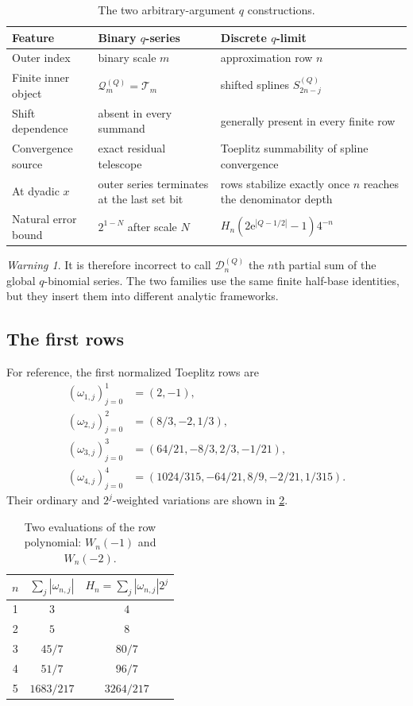 \documentclass[11pt,oneside]{article}
\theoremstyle{definition}
\theoremstyle{remark}
\newtheorem{warning}[warning]{Warning}
\newcommand{\e}{\mathrm e}
\begin{document}
\begin{table}[ht]
\centering
\small
\begin{tabularx}{\textwidth}{@{}p{}XX@{}}
\toprule
Feature & Binary $q$-series & Discrete $q$-limit \\
\midrule
Outer index & binary scale $m$ & approximation row $n$ \\
Finite inner object & $\mathcal Q_m^{(Q)}=\mathcal T_m$ & shifted splines $S_{2n-j}^{(Q)}$ \\
Shift dependence & absent in every summand & generally present in every finite row \\
Convergence source & exact residual telescope & Toeplitz summability of spline convergence \\
At dyadic $x$ & outer series terminates at the last set bit & rows stabilize exactly once $n$ reaches the denominator depth \\
Natural error bound & $2^{1-N}$ after scale $N$ & $H_n(2\e^{|Q-1/2|}-1)4^{-n}$ \\
\bottomrule
\end{tabularx}
\caption{The two arbitrary-argument $q$ constructions.}
\label{dyadicweb:tab:two-infinite}
\end{table}

\begin{warning}
It is therefore incorrect to call $\mathcal D_n^{(Q)}$ the $n$th partial sum of the global
$q$-binomial series.  The two families use the same finite half-base identities, but they
insert them into different analytic frameworks.
\end{warning}

\subsection{The first rows}

For reference, the first normalized Toeplitz rows are
\begin{align*}
 (\omega_{1,j})_{j=0}^{1}&=(2,-1),\\
 (\omega_{2,j})_{j=0}^{2}&=(8/3,-2,1/3),\\
 (\omega_{3,j})_{j=0}^{3}&=(64/21,-8/3,2/3,-1/21),\\
 (\omega_{4,j})_{j=0}^{4}&=(1024/315,-64/21,8/9,-2/21,1/315).
\end{align*}
Their ordinary and $2^j$-weighted variations are shown in
\cref{dyadicweb:tab:row-constants}.

\begin{table}[ht]
\centering
\small
\begin{tabular}{@{}c c c@{}}
\toprule
$n$ & $\sum_j|\omega_{n,j}|$ & $H_n=\sum_j|\omega_{n,j}|2^j$ \\
\midrule
1 & $3$ & $4$ \\
2 & $5$ & $8$ \\
3 & $45/7$ & $80/7$ \\
4 & $51/7$ & $96/7$ \\
5 & $1683/217$ & $3264/217$ \\
\bottomrule
\end{tabular}
\caption{Two evaluations of the row polynomial: $W_n(-1)$ and $W_n(-2)$.}
\label{dyadicweb:tab:row-constants}
\end{table}
\end{document}
